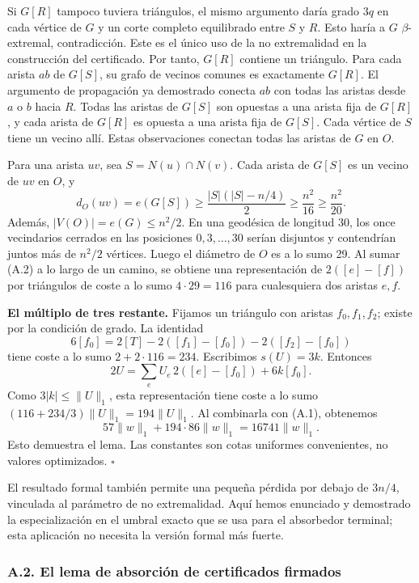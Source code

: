 \documentclass[spanish,11pt,a4paper]{article}
\begin{document}
Si \(G[R]\) tampoco tuviera triángulos, el mismo argumento daría grado \(3q\) en cada vértice de \(G\) y un corte completo equilibrado entre \(S\) y \(R\). Esto haría a \(G\) \(\beta\)-extremal, contradicción. Este es el único uso de la no extremalidad en la construcción del certificado. Por tanto, \(G[R]\) contiene un triángulo. Para cada arista \(ab\) de \(G[S]\), su grafo de vecinos comunes es exactamente \(G[R]\). El argumento de propagación ya demostrado conecta \(ab\) con todas las aristas desde \(a\) o \(b\) hacia \(R\). Todas las aristas de \(G[S]\) son opuestas a una arista fija de \(G[R]\), y cada arista de \(G[R]\) es opuesta a una arista fija de \(G[S]\). Cada vértice de \(S\) tiene un vecino allí. Estas observaciones conectan todas las aristas de \(G\) en \(O\).

Para una arista \(uv\), sea \(S=N(u)\cap N(v)\). Cada arista de \(G[S]\) es un vecino de \(uv\) en \(O\), y \[d_O(uv)=e(G[S])\ge\frac{|S|(|S|-n/4)}2\ge\frac{n^2}{16}\ge\frac{n^2}{20}.\] Además, \(|V(O)|=e(G)\le n^2/2\). En una geodésica de longitud 30, los once vecindarios cerrados en las posiciones \(0,3,\ldots,30\) serían disjuntos y contendrían juntos más de \(n^2/2\) vértices. Luego el diámetro de \(O\) es a lo sumo 29. Al sumar (A.2) a lo largo de un camino, se obtiene una representación de \(2([e]-[f])\) por triángulos de coste a lo sumo \(4\cdot29=116\) para cualesquiera dos aristas \(e,f\).

\textbf{El múltiplo de tres restante.} Fijamos un triángulo con aristas \(f_0,f_1,f_2\); existe por la condición de grado. La identidad \[6[f_0]=2[T]-2([f_1]-[f_0])-2([f_2]-[f_0])\] tiene coste a lo sumo \(2+2\cdot116=234\). Escribimos \(s(U)=3k\). Entonces \[2U=\sum_e U_e\,2([e]-[f_0])+6k[f_0].\] Como \(3|k|\le\|U\|_1\), esta representación tiene coste a lo sumo \((116+234/3)\|U\|_1=194\|U\|_1\). Al combinarla con (A.1), obtenemos \[57\|w\|_1+194\cdot86\|w\|_1=16741\|w\|_1.\] Esto demuestra el lema. Las constantes son cotas uniformes convenientes, no valores optimizados. \(\square\)

El resultado formal también permite una pequeña pérdida por debajo de \(3n/4\), vinculada al parámetro de no extremalidad. Aquí hemos enunciado y demostrado la especialización en el umbral exacto que se usa para el absorbedor terminal; esta aplicación no necesita la versión formal más fuerte.

\subsubsection{A.2. El lema de absorción de certificados firmados}\label{a.2.-el-lema-de-absorciuxf3n-de-certificados-firmados}
\end{document}
